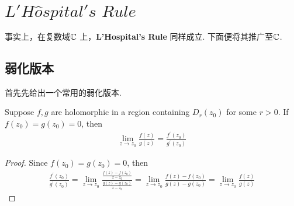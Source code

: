 \ifx\allfiles\undefined


	\else
	\fi

\appendix
\chapter{$L'H\hat{o}spital's \,\, Rule$}
事实上，在复数域$\mathbb{C}$ 上，\textbf{L'Hospital's Rule} 同样成立. 下面便将其推广至$\mathbb{C}$.

\section{弱化版本}
首先先给出一个常用的弱化版本.
\begin{thm}\label{thm A.1.1}
	Suppose $f , g$ are holomorphic in a region containing $D_{r}(z_0)$ for some $r > 0$. If $f(z_0) = g(z_0) = 0$, then
	\begin{align}
		\lim_{z \to z_0}{\frac{f(z)}{g(z)}} = \frac{f^{'}(z_0)}{g^{'}(z_0)}
	\end{align}
	
	\vspace{2em}
	\begin{proof}
		Since $f(z_0) = g(z_0) = 0$, then
		\begin{align}
			\frac{f^{'}(z_0)}{g^{'}(z_0)}
			= \lim_{z \to z_0}{\frac{\frac{f(z) - f(z_0)}{z - z_0}}{\frac{g(z) - g(z_0)}{z - z_0}}}
			= \lim_{z \to z_0}{\frac{f(z) - f(z_0)}{g(z) - g(z_0)}}
			= \lim_{z \to z_0}{\frac{f(z)}{g(z)}}
		\end{align}
	\end{proof}
\end{thm}






	\ifx\allfiles\undefined

\fi